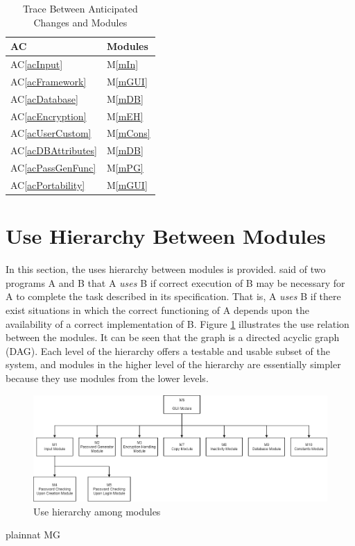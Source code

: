 \documentclass[12pt, titlepage]{article}
\newcommand{\acref}[1]{AC\ref{#1}}
\newcommand{\mref}[1]{M\ref{#1}}
\begin{document}
\begin{table}[H]
\centering
\begin{tabular}{p{} p{}}
\toprule
\textbf{AC} & \textbf{Modules}\\
\midrule
\acref{acInput} & \mref{mIn}\\
\acref{acFramework} & \mref{mGUI}\\
\acref{acDatabase} & \mref{mDB}\\
\acref{acEncryption} & \mref{mEH}\\
\acref{acUserCustom} & \mref{mCons}\\
\acref{acDBAttributes} & \mref{mDB}\\
\acref{acPassGenFunc} & \mref{mPG}\\
\acref{acPortability} & \mref{mGUI}\\
\bottomrule
\end{tabular}
\caption{Trace Between Anticipated Changes and Modules}
\label{TblACT}
\end{table}

\section{Use Hierarchy Between Modules} \label{SecUse}

In this section, the uses hierarchy between modules is
provided. \citet{Parnas1978} said of two programs A and B that A {\em uses} B if
correct execution of B may be necessary for A to complete the task described in
its specification. That is, A {\em uses} B if there exist situations in which
the correct functioning of A depends upon the availability of a correct
implementation of B.  Figure \ref{FigUH} illustrates the use relation between
the modules. It can be seen that the graph is a directed acyclic graph
(DAG). Each level of the hierarchy offers a testable and usable subset of the
system, and modules in the higher level of the hierarchy are essentially simpler
because they use modules from the lower levels.

\begin{figure}[H]
\centering
\includegraphics[scale=0.5]{Images/DAG.png}
\caption{Use hierarchy among modules}
\label{FigUH}
\end{figure}


 {plainnat}
 {MG}
\end{document}
